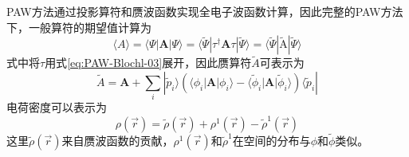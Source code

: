 \textrm{PAW}方法通过投影算符和赝波函数实现全电子波函数计算，因此完整的\textrm{PAW}方法下，一般算符的期望值计算为
\begin{equation}
	\langle A \rangle=\langle\Psi|\mathbf{A}|\Psi\rangle=\langle\tilde\Psi|\tau^{\dag}\mathbf{A}\tau|\tilde\Psi\rangle=\langle\tilde\Psi|\tilde{\mathrm{A}}|\tilde\Psi\rangle
	\label{eq:PAW-Blochl-04}
\end{equation}
式中将$\tau$用式\eqref{eq:PAW-Blochl-03}展开，因此赝算符$\tilde A$可表示为
\begin{equation}
	\tilde A=\mathbf{A}+\sum_i|\tilde p_i\rangle(\langle\phi_i|\mathbf{A}|\phi_i\rangle-\langle\tilde\phi_i|\mathbf{A}|\tilde\phi_i\rangle)\langle\tilde p_i|
	\label{eq:PAW-Blochl-05}
\end{equation}
电荷密度可以表示为
\begin{equation}
	\rho(\vec r)=\tilde \rho(\vec r)+\rho^1(\vec r)-\tilde\rho^1(\vec r)
	\label{eq:PAW-Blochl-07}
\end{equation}
这里$\tilde\rho(\vec r)$来自赝波函数的贡献，$\rho^1(\vec r)$和$\tilde\rho^1$在空间的分布与$\phi$和$\tilde\phi$类似。

